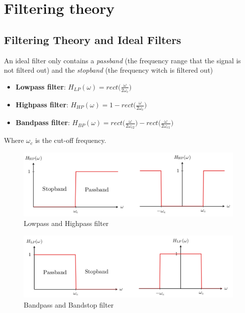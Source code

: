 
\newpage
\section{Filtering theory}
\subsection{Filtering Theory and Ideal Filters}
An ideal filter only contains a \textit{passband} (the frequency range that the signal is not filterd out) 
and the \textit{stopband} (the frequency witch is filtered out)

\begin{itemize}
    \item \textbf{Lowpass filter}:
    $H_{LP}(\omega) = rect\big( \frac{\omega}{2\omega_c} \big)$
    \item \textbf{Highpass filter}:
    $H_{HP}(\omega) = 1-rect\big( \frac{\omega}{2\omega_c} \big)$
    \item \textbf{Bandpass filter}:
    $H_{BP}(\omega) = rect\big( \frac{\omega}{2\omega_{c2}} \big) - rect\big( \frac{\omega}{2\omega_{c1}} \big)$
\end{itemize}
Where $\omega_c$ is the cut-off frequency.

\begin{figure}[!h]
    \centering
    \includegraphics[width=12cm]{image/filter-lp-hp.pdf}
    \caption{Lowpass and Highpass filter}
    \label{fig:filter-lp-hp}
\end{figure}

\begin{figure}[!h]
    \centering
    \includegraphics[width=12cm]{image/filter-bp-bs.pdf}
    \caption{Bandpass and Bandstop filter}
    \label{fig:filter-bp-bs}
\end{figure}


